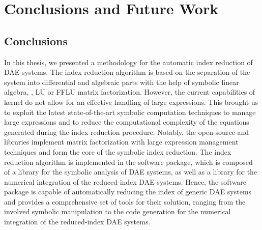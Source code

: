 
\chapter{Conclusions and Future Work}
\label{chap6:conclusions}

\section{Conclusions}

In this thesis, we presented a methodology for the automatic index reduction of \ac{DAE} systems. The index reduction algorithm is based on the separation of the system into differential and algebraic parts with the help of symbolic linear algebra, \ie{}, \ac{LU} or \ac{FFLU} matrix factorization. However, the current capabilities of \Maple{} kernel do not allow for an effective handling of large expressions. This brought us to exploit the latest state-of-the-art symbolic computation techniques to manage large expressions and to reduce the computational complexity of the equations generated during the index reduction procedure. Notably, the open-source \LEM{} and \LAST{} libraries implement matrix factorization with large expression management techniques and form the core of the symbolic index reduction. The index reduction algorithm is implemented in the \Indigo{} software package, which is composed of a \Maple{} library for the symbolic analysis of \ac{DAE} systems, as well as a \Matlab{} library for the numerical integration of the reduced-index \ac{DAE} systems. Hence, the \Indigo{} software package is capable of automatically reducing the index of generic \ac{DAE} systems and provides a comprehensive set of tools for their solution, ranging from the involved symbolic manipulation to the \Matlab{} code generation for the numerical integration of the reduced-index \ac{DAE} systems.

